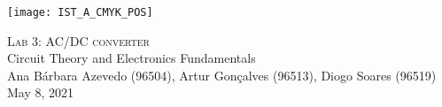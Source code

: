 
\thispagestyle {empty}

\texttt{[image: IST\_A\_CMYK\_POS]}

\begin{center}
%
\vspace{1.0cm}

\vspace{3cm}
\textsc{\Huge Lab 3: AC/DC converter}\\
\vspace{0.5cm}
{\Large Circuit Theory and Electronics Fundamentals} \\
\vspace{0.8cm}
{\normalsize Ana Bárbara Azevedo (96504), Artur Gonçalves (96513), Diogo Soares (96519)} \\

\vspace{0.5cm}
{May 8, 2021}\\
\end{center}
\vspace{2.5cm}

